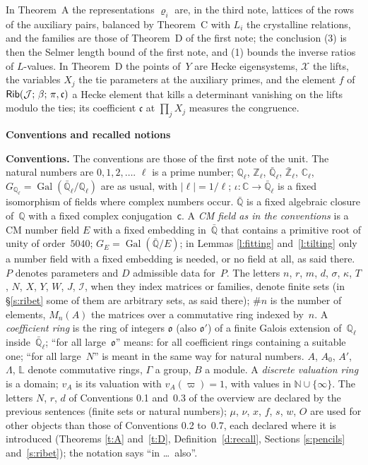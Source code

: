 \documentclass[11pt,a4paper]{article}
\newcommand{\Gal}{\operatorname{Gal}}
\newcommand{\m}[1]{\mbox{$#1$}}        %
\newcommand{\sect}[2]{\refstepcounter{section}\label{#2}\par\addvspace{19pt plus 4pt minus 2pt}\Needspace{7\baselineskip}%
  \noindent\llap{{\fontsize{13.2}{16}\selectfont\bfseries\color{inkfaint}\thesection}\hspace{9pt}}%
  {\fontsize{13.2}{16}\selectfont\bfseries\color{ink}#1}\par\nopagebreak\vspace{-1pt}}
\theoremstyle{plainx}
\theoremstyle{uprightx}
\newenvironment{conventions}{\par\addvspace{5pt}\noindent\textbf{Conventions.}\enspace\ignorespaces}{\par\addvspace{3pt}}
\newcommand{\CC}{\mathbb{C}}
\newcommand{\NN}{\mathbb{N}}
\newcommand{\Qb}{\bar{\mathbb{Q}}}
\newcommand{\Ql}{\mathbb{Q}_\ell}
\newcommand{\Zl}{\mathbb{Z}_\ell}
\newcommand{\Qlb}{\bar{\mathbb{Q}}_\ell}
\newcommand{\Zlb}{\bar{\mathbb{Z}}_\ell}
\newcommand{\Cl}{\mathbb{C}_\ell}
\newcommand{\Gl}{G_{\mathbb{Q}_\ell}}
\newcommand{\GE}[1]{G_{#1}}
\newcommand{\fo}{\mathfrak{o}}
\begin{document}
In Theorem~A the representations $\varrho_i$ are, in the third note, lattices of the rows of the auxiliary pairs,
balanced by Theorem~C with \m{L_i} the crystalline relations, and the families are those of Theorem~D of the
first note; the conclusion (3) is then the Selmer length bound of the first note, and (1) bounds the inverse
ratios of $L$-values. In Theorem~D the points of~$Y$ are Hecke eigensystems, $\mathcal{X}$ the lifts, the
variables $X_j$ the tie parameters at the auxiliary primes, and the element $f$ of
\m{\IsRibetElement{\mathcal{J}}{\beta}{\pi}{\mathfrak{c}}} a Hecke element that kills a determinant vanishing on the lifts
modulo the ties; its coefficient $\mathfrak{c}$ at \m{\prod_jX_j} measures the congruence.

\sect{Conventions and recalled notions}{s:back}
\begin{conventions}\label{c:conventions}
The conventions are those of the first note of the unit. The natural numbers are \m{0,1,2,\dots}. $\ell$ is a
prime number; \m{\Ql}, \m{\Zl}, \m{\Qlb}, \m{\Zlb}, \m{\Cl}, \m{\Gl=\Gal(\Qlb/\Ql)} are as usual, with
\m{|\ell|=1/\ell}; \m{\iota\colon\CC\to\Qlb} is a fixed isomorphism of fields where complex numbers occur. \m{\Qb}
is a fixed algebraic closure of~$\mathbb{Q}$ with a fixed complex conjugation~$\mathsf{c}$. A \emph{CM field as
in the conventions} is a CM number field $E$ with a fixed embedding in~\m{\Qb} that contains a primitive root of
unity of order~$5040$; \m{\GE{E}=\Gal(\Qb/E)}; in Lemmas \ref{l:fitting} and~\ref{l:tilting} only a number field with a
fixed embedding is needed, or no field at all, as said there. $P$ denotes parameters and $D$ admissible data
for~$P$. The letters $n$, $r$, $m$, $d$, $\sigma$, $\kappa$, $T$, $N$, $X$, $Y$, $W$, $J$, $\mathcal{I}$, when they
index matrices or families, denote finite sets (in §\ref{s:ribet} some of them are arbitrary sets, as said there); \m{\#n} is the number of elements, \m{M_n(A)} the matrices over a commutative
ring indexed by~$n$. A \emph{coefficient ring} is the ring of integers $\fo$ (also $\fo'$) of a finite Galois
extension of~\m{\Ql} inside~\m{\Qlb}; ``for all large~$\fo$'' means: for all coefficient rings containing a
suitable one; ``for all large~$N$'' is meant in the same way for natural numbers. $A$, $A_0$, $A'$, $\Lambda$, $\mathbb{L}$ denote commutative rings, $\Gamma$ a group,
$B$ a module. A \emph{discrete valuation ring} is a domain; \m{v_A} is its valuation with \m{v_A(\varpi)=1}, with
values in \m{\NN\cup\{\infty\}}. The letters $N$, $r$, $d$ of Conventions 0.1 and~0.3 of the overview are declared by the
previous sentences (finite sets or natural numbers); $\mu$, $\nu$, $x$, $f$, $s$, $w$, $O$ are used for other objects than
those of Conventions 0.2 to~0.7, each declared where it is introduced (Theorems \ref{t:A} and~\ref{t:D}, Definition~\ref{d:recall},
Sections \ref{s:pencils} and~\ref{s:ribet}); the notation says ``in \dots\ also''.
\end{conventions}
\end{document}
